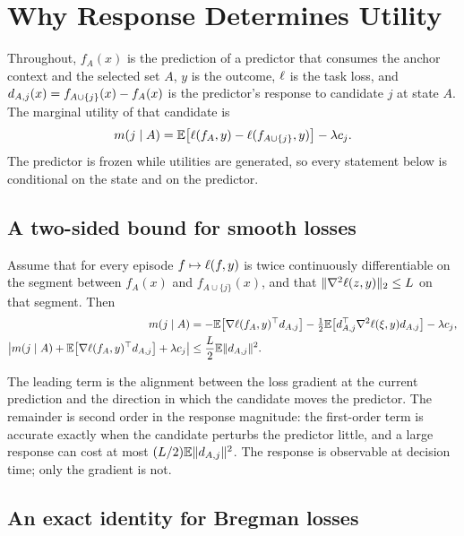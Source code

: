 \section{Why Response Determines Utility}
\label{sec:theory}

Throughout, $f_A(x)$ is the prediction of a predictor that consumes the anchor
context and the selected set $A$, $y$ is the outcome, $\ell$ is the task loss,
and $d_{A,j}(x)=f_{A\cup\{j\}}(x)-f_A(x)$ is the predictor's response to candidate
$j$ at state $A$. The marginal utility of that candidate is
\begin{equation}
 m(j\mid A)=\mathbb{E}\!\left[\ell(f_A,y)-\ell(f_{A\cup\{j\}},y)\right]-\lambda c_j .
 \label{eq:marginal-utility}
\end{equation}
The predictor is frozen while utilities are generated, so every statement below
is conditional on the state and on the predictor.

\subsection{A two-sided bound for smooth losses}

\begin{proposition}
\label{prop:expansion}
Assume that for every episode $f\mapsto\ell(f,y)$ is twice continuously
differentiable on the segment between $f_A(x)$ and $f_{A\cup\{j\}}(x)$, and that
$\|\nabla^2\ell(z,y)\|_2\leq L$ on that segment. Then
\begin{align}
 m(j\mid A)
 &=
 -\mathbb{E}\!\left[\nabla\ell(f_A,y)^\top d_{A,j}\right]
 -\tfrac12\mathbb{E}\!\left[d_{A,j}^\top\nabla^2\ell(\xi,y)d_{A,j}\right]
 -\lambda c_j,
 \label{eq:prop-expansion}\\
 \left|m(j\mid A)
 +\mathbb{E}\!\left[\nabla\ell(f_A,y)^\top d_{A,j}\right]+\lambda c_j\right|
 &\leq
 \frac{L}{2}\mathbb{E}\|d_{A,j}\|^2 .
 \label{eq:prop-bound}
\end{align}
\end{proposition}

The leading term is the alignment between the loss gradient at the current
prediction and the direction in which the candidate moves the predictor. The
remainder is second order in the response magnitude: the first-order term is
accurate exactly when the candidate perturbs the predictor little, and a large
response can cost at most $(L/2)\mathbb{E}\|d_{A,j}\|^2$. The response is observable at
decision time; only the gradient is not.

\subsection{An exact identity for Bregman losses}

